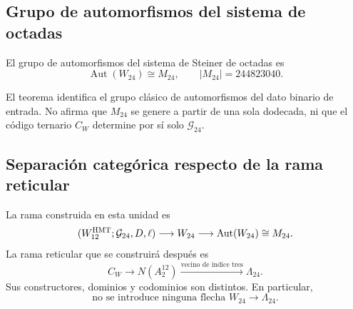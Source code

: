 \subsection{Grupo de automorfismos del sistema de octadas}

\begin{theorem}
\label{p12-83-c20-s3:thm:automorfismos-w24-m24}
El grupo de automorfismos del sistema de Steiner de octadas es
\begin{equation}
 \boxed{
 \operatorname{Aut}(W_{24})\cong M_{24},
 \qquad
 |M_{24}|=244823040.}
 \label{p12-83-c20-s3:eq:automorfismos-w24-m24}
\end{equation}
\end{theorem}

El teorema identifica el grupo clásico de automorfismos del dato binario
de entrada. No afirma que \(M_{24}\) se genere a partir de una sola
dodecada, ni que el código ternario \(C_W\) determine por sí solo
\(\mathcal G_{24}\).

\subsection{Separación categórica respecto de la rama reticular}

La rama construida en esta unidad es
\begin{equation}
 (W_{12}^{\rm HMT};\mathcal G_{24},D,\ell)
 \longrightarrow W_{24}
 \longrightarrow\operatorname{Aut}(W_{24})\cong M_{24}.
 \label{p12-83-c20-s3:eq:rama-binaria-w24-m24}
\end{equation}
La rama reticular que se construirá después es
\begin{equation}
 C_W\longrightarrow N(A_2^{12})
 \xrightarrow{\text{vecino de índice tres}}\Lambda_{24}.
 \label{p12-83-c20-s3:eq:rama-ternaria-niemeier-leech-anunciada}
\end{equation}
Sus constructores, dominios y codominios son distintos. En particular,
\begin{equation}
 \boxed{
 \text{no se introduce ninguna flecha }
 W_{24}\longrightarrow\Lambda_{24}.}
 \label{p12-83-c20-s3:eq:no-flecha-w24-leech}
\end{equation}

